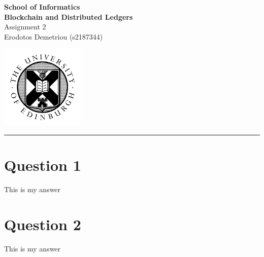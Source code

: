 \documentclass[12pt,a4paper]{article}
\begin{document}
\noindent
\begin{minipage}{120mm}
        {\huge {\bf School of Informatics}}\\
        {\Large {\bf Blockchain and Distributed Ledgers}}\\

        {\Large Assignment 2}\\
        {\normalsize Erodotos Demetriou (s2187344)}
\end{minipage}
\hfill
\begin{minipage}{40mm}              
        \includegraphics[width=40mm]{crest.png}
\end{minipage}

\begin{center}
\rule{\linewidth}{0.5mm}
\end{center}


\section*{Question 1}
This is my answer

\section*{Question 2}
This is my answer
\end{document}
